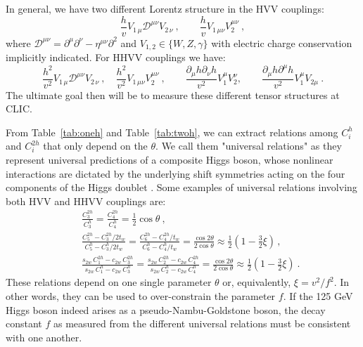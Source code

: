 In general, we have two different Lorentz structure in the HVV couplings:
\begin{equation}
\label{eq:lstruc1}
\frac{h}{v} V_{1\,\mu} \mathcal{D}^{\mu\nu} V_{2\,\nu} \ ,\qquad \frac{h}{v} V_{1\,\mu\nu}  V_2^{\mu\nu} \ ,
\end{equation}
where  ${\mathcal{D}}^{\mu\nu} = \partial^\mu\partial^\nu-\eta^{\mu\nu}\partial^2$ and $V_{1,2} \in\{W, Z,\gamma\}$ with electric charge conservation implicitly indicated. For HHVV couplings we have: 
\begin{equation}
\frac{h^2}{v^2} V_{1\,\mu} {\mathcal{D}}^{\mu\nu} V_{2\,\nu}\ , \quad  \frac{h^2}{v^2} V_{1\,\mu\nu}  V_2^{ \mu\nu} \ , \qquad \frac{\partial_\mu h \partial_\nu h}{v^2} V_1^\mu V_2^{\nu}, \qquad \frac{\partial_\mu h \partial^\mu h}{v^2} V_1^\mu V_{2\mu} \ .
\label{eq:lstruc2}
\end{equation}
The ultimate goal then will be to measure these different tensor structures at CLIC.

From Table~\ref{tab:oneh} and Table~\ref{tab:twoh}, we can extract relations among $C_i^{h}$ and $C_i^{2h}$ that only depend on the $\theta$. We call them "universal relations" as they represent universal predictions of a composite Higgs boson, whose nonlinear interactions are dictated by the underlying shift symmetries acting on the four components of the Higgs doublet \cite{Low:2014nga,Low:2014oga,Liu:2018vel,Liu:2018qtb}.  Some examples of universal relations involving both HVV and HHVV couplings are:
\begin{eqnarray}
\label{eq:ident3}
&& \frac{C^{2h}_3}{C^h_3} = \frac{C^{2h}_4}{C^h_4} =\frac12 \cos\theta  \ ,\\
\label{eq:ident4}
&& \frac{C^{2h}_5 - C^{2h}_3 /2t_w} {C^h_5 - C^{h}_3/2t_{w}} =  \frac{C^{2h}_6 -C^{2h}_4/t_{w} }{C^h_6 - C^{h}_4/t_{w}} = \frac{\cos2\theta}{2\cos\theta} \approx \frac12\left(1 - \frac32 \xi \right)\, ,\\
&&\frac{s_{2w} \,C^{2h}_1 - c_{2w}\,   C^{2h}_3} {s_{2w}\, C^h_1-c_{2w} \,  C^{h}_3} =\frac{s_{2w}\, C^{2h}_2 - c_{2w}\,   C^{2h}_4} {s_{2w}\, C^h_2-c_{2w}\,   C^{h}_4}  = \frac{\cos2\theta}{2\cos\theta}\approx \frac12\left(1 - \frac32 \xi \right)\ .
\end{eqnarray}
These relations depend on one single parameter $\theta$ or, equivalently, $\xi=v^2/f^2$. In other words, they can be used to over-constrain the parameter $f$. If the 125 GeV Higgs boson indeed arises as a pseudo-Nambu-Goldstone boson, the decay constant $f$ as measured from the different universal relations must be consistent with one another.





